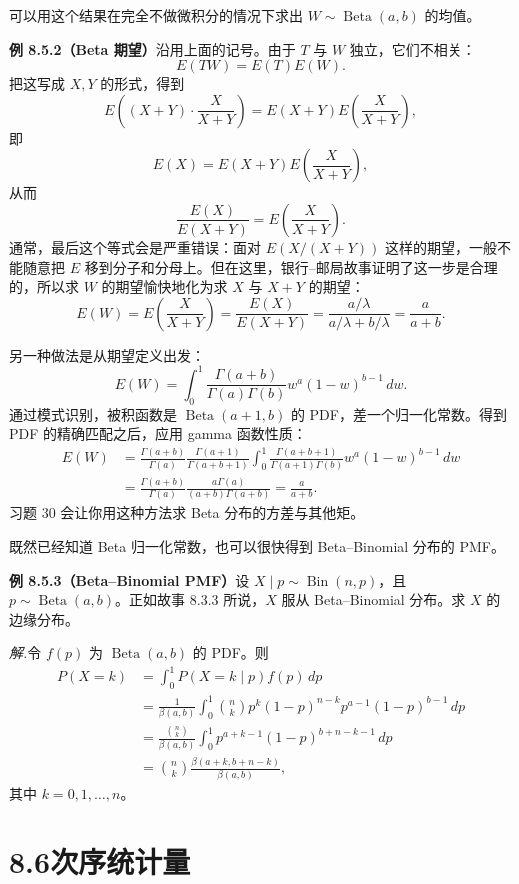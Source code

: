 \documentclass[UTF8, 12pt, fontset=fandol, oneside]{ctexart}
\begin{document}
可以用这个结果在完全不做微积分的情况下求出 $W\sim\operatorname{Beta}(a,b)$ 的均值。

\noindent\textbf{例 8.5.2（Beta 期望）}\quad 沿用上面的记号。由于 $T$ 与 $W$ 独立，它们不相关：
\[
  E(TW)=E(T)E(W).
\]
把这写成 $X,Y$ 的形式，得到
\[
  E\left((X+Y)\cdot\frac{X}{X+Y}\right)
  =
  E(X+Y)E\left(\frac{X}{X+Y}\right),
\]
即
\[
  E(X)=E(X+Y)E\left(\frac{X}{X+Y}\right),
\]
从而
\[
  \frac{E(X)}{E(X+Y)}
  =
  E\left(\frac{X}{X+Y}\right).
\]
通常，最后这个等式会是严重错误：面对 $E(X/(X+Y))$ 这样的期望，一般不能随意把 $E$ 移到分子和分母上。但在这里，银行--邮局故事证明了这一步是合理的，所以求 $W$ 的期望愉快地化为求 $X$ 与 $X+Y$ 的期望：
\[
  E(W)=E\left(\frac{X}{X+Y}\right)
  =
  \frac{E(X)}{E(X+Y)}
  =
  \frac{a/\lambda}{a/\lambda+b/\lambda}
  =
  \frac{a}{a+b}.
\]

另一种做法是从期望定义出发：
\[
  E(W)=\int_0^1 \frac{\Gamma(a+b)}{\Gamma(a)\Gamma(b)}
  w^a(1-w)^{b-1}\,dw.
\]
通过模式识别，被积函数是 $\operatorname{Beta}(a+1,b)$ 的 PDF，差一个归一化常数。得到 PDF 的精确匹配之后，应用 gamma 函数性质：
\[
\begin{aligned}
  E(W)
  &=
  \frac{\Gamma(a+b)}{\Gamma(a)}
  \frac{\Gamma(a+1)}{\Gamma(a+b+1)}
  \int_0^1 \frac{\Gamma(a+b+1)}{\Gamma(a+1)\Gamma(b)}
  w^a(1-w)^{b-1}\,dw\\
  &=
  \frac{\Gamma(a+b)}{\Gamma(a)}
  \frac{a\Gamma(a)}{(a+b)\Gamma(a+b)}
  =
  \frac{a}{a+b}.
\end{aligned}
\]
习题 30 会让你用这种方法求 Beta 分布的方差与其他矩。

既然已经知道 Beta 归一化常数，也可以很快得到 Beta--Binomial 分布的 PMF。

\noindent\textbf{例 8.5.3（Beta--Binomial PMF）}\quad 设 $X\mid p\sim\operatorname{Bin}(n,p)$，且 $p\sim\operatorname{Beta}(a,b)$。正如故事 8.3.3 所说，$X$ 服从 Beta--Binomial 分布。求 $X$ 的边缘分布。

\noindent\textit{解.}\quad 令 $f(p)$ 为 $\operatorname{Beta}(a,b)$ 的 PDF。则
\[
\begin{aligned}
  P(X=k)
  &=\int_0^1 P(X=k\mid p)f(p)\,dp\\
  &=\frac1{\beta(a,b)}
    \int_0^1 {n\choose k}p^k(1-p)^{n-k}p^{a-1}(1-p)^{b-1}\,dp\\
  &=\frac{{n\choose k}}{\beta(a,b)}
    \int_0^1 p^{a+k-1}(1-p)^{b+n-k-1}\,dp\\
  &={n\choose k}\frac{\beta(a+k,b+n-k)}{\beta(a,b)},
\end{aligned}
\]
其中 $k=0,1,\ldots,n$。

\section*{8.6\quad 次序统计量}
\end{document}
